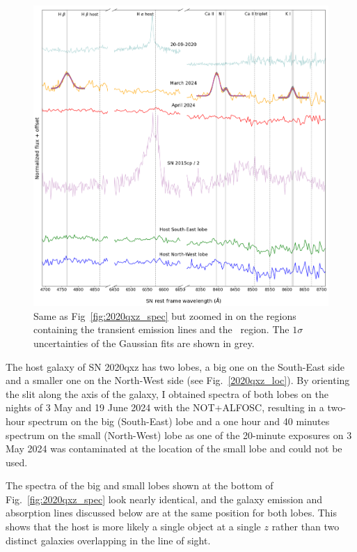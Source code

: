 \documentclass[a4paper,oneside,12pt, class=Latex/Classes/PhDthesisPSnPDF, crop=false]{standalone}
\begin{document}
\begin{figure}
    \centering
    \includegraphics[width=\textwidth]{../Images/chapter_5/2020qxz_spec_zoom.png}
    \caption{Same as Fig~\ref{fig:2020qxz_spec} but zoomed in on the regions containing the transient emission lines and the \Halpha\ region. The $1\sigma$ uncertainties of the Gaussian fits are shown in grey.}
    \label{2020qxz_spec_zoom}
\end{figure}

The host galaxy of SN 2020qxz has two lobes, a big one on the South-East side and a smaller one on the North-West side (see Fig.~\ref{2020qxz_loc}). By orienting the slit along the axis of the galaxy, I obtained spectra of both lobes on the nights of 3 May and 19 June 2024 with the NOT+ALFOSC, resulting in a two-hour spectrum on the big (South-East) lobe and a one hour and 40 minutes spectrum on the small (North-West) lobe as one of the 20-minute exposures on 3 May 2024 was contaminated at the location of the small lobe and could not be used.

The spectra of the big and small lobes shown at the bottom of Fig.~\ref{fig:2020qxz_spec} look nearly identical, and the galaxy emission and absorption lines discussed below are at the same position for both lobes. This shows that the host is more likely a single object at a single $z$ rather than two distinct galaxies overlapping in the line of sight.
\end{document}
